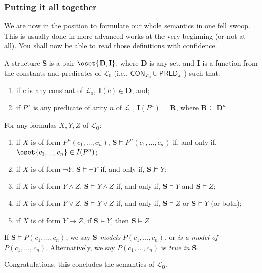 \subsubsection{Putting it all together}

We are now in the position to formulate our whole semantics in one fell swoop. This is usually done in more advanced works at the very beginning (or not at all). You shall now be able to read those definitions with confidence. 

\begin{defn} \label{models}
	A structure $\mathbf{S}$ is a pair $\oset{\mathbf{D}, \mathbf{I}}$, where $\mathbf{D}$ is any set, and $\mathbf{I}$ is a function from the constants and predicates of $\mathcal{L}_0$ (i.e., $\mathsf{CON}_{\mathcal{L}_0} \cup \mathsf{PRED}_{\mathcal{L}_0}$) such that:
	\begin{enumerate}
		\item if $c$ is any constant of $\mathcal{L}_0$, $\mathbf{I}(c) \in \mathbf{D}$, and;
		\item if $P^n$ is any predicate  of arity $n$ of $\mathcal{L}_0$, $\mathbf{I}(P^n)=\mathbf{R}$, where $\mathbf{R} \subseteq \mathbf{D}^n$. 
	\end{enumerate}
	For any formulas $X, Y, Z$ of $\mathcal{L}_0$:
	
	\begin{enumerate}
	\item if $X$ is of form $P^n(c_1, ..., c_n)$, $\mathbf{S} \models P^n(c_1, ..., c_n)$ if, and only if, $\oset{c_1, ..., c_n} \in I(P^n)$;
	\item if $X$ is of form $\neg Y$, $\mathbf{S} \models \neg Y$ if, and only if, $\mathbf{S} \not\models Y$;
	\item if $X$ is of form $Y \wedge Z$, $\mathbf{S} \models Y \wedge Z$ if, and only if, $\mathbf{S} \models Y$ and $\mathbf{S}\models Z$;
	\item if $X$ is of form $Y \vee Z$,  $\mathbf{S} \models Y \vee Z$ if, and only if, $\mathbf{S} \models Z$ or $\mathbf{S}\models Y$ (or both);
	\item if $X$ is of form $Y \rightarrow Z$, if $\mathbf{S} \models Y$, then $\mathbf{S} \models Z$. 
	\end{enumerate}
	
	If $\mathbf{S} \models P(c_1, ..., c_n)$, we say $\mathbf{S}$ \textit{models} $P(c_1, ..., c_n)$, or \textit{is a model of} $P(c_1, ..., c_n)$. Alternatively, we say $P(c_1, ..., c_n)$ is \textit{true in} $\mathbf{S}$.
\end{defn}

Congratulations, this concludes the semantics of $\mathcal{L}_0$.

